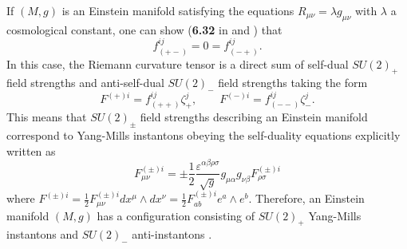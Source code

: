 \documentclass[12pt,epsf]{article}
\begin{document}
If $(M, g)$ is an Einstein manifold satisfying the equations $R_{\mu\nu} = \lambda g_{\mu\nu}$ with $\lambda$
a cosmological constant, one can show (\textbf{6.32} in \cite{book-besse} and \cite{oh-yang,joy-jhep}) that
\begin{equation}\label{e-man}
f^{ij}_{(+-)} = 0 = f^{ij}_{(-+)}.
\end{equation}
In this case, the Riemann curvature tensor  is a direct sum of self-dual $SU(2)_+$ field strengths
and anti-self-dual $SU(2)_-$ field strengths taking the form
\begin{equation} \label{em-sd}
  F^{(+)i} = f^{ij}_{(++)} \zeta^j_+ , \qquad
  F^{(-)i} =  f^{ij}_{(--)} \zeta^j_-.
\end{equation}
This means that $SU(2)_\pm$ field strengths describing an Einstein manifold correspond to Yang-Mills instantons
obeying the self-duality equations explicitly written as
\begin{equation}\label{sdasd-eq}
  F^{(\pm) i}_{\mu\nu} = \pm \frac{1}{2} \frac{\varepsilon^{\alpha\beta\rho\sigma}}{\sqrt{g}}
  g_{\mu \alpha} g_{\nu \beta} F^{(\pm) i}_{\rho\sigma}
\end{equation}
where $F^{(\pm) i}= \frac{1}{2} F^{(\pm) i}_{\mu\nu} dx^\mu \wedge dx^\nu
= \frac{1}{2} F^{(\pm) i}_{ab} e^a \wedge e^b$.
Therefore, an Einstein manifold $(M, g)$ has a configuration consisting of $SU(2)_+$ Yang-Mills instantons
and $SU(2)_-$ anti-instantons \cite{oh-yang}.
\end{document}
